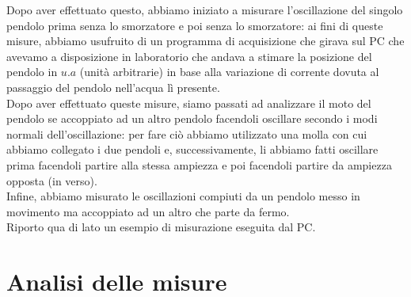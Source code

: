 \documentclass{article}
\begin{document}
\begin{minipage}{0.49\textwidth}
Dopo aver effettuato questo, abbiamo iniziato a misurare l'oscillazione del singolo pendolo prima senza lo smorzatore e poi senza lo smorzatore: ai fini di queste misure, abbiamo usufruito di un programma di acquisizione che girava sul PC che avevamo a disposizione in laboratorio che andava a stimare la posizione del pendolo in $u.a$ (unità arbitrarie) in base alla variazione di corrente dovuta al passaggio del pendolo nell'acqua lì presente. \\
Dopo aver effettuato queste misure, siamo passati ad analizzare il moto del pendolo se accoppiato ad un altro pendolo facendoli oscillare secondo i modi normali dell'oscillazione: per fare ciò abbiamo utilizzato una molla con cui abbiamo collegato i due pendoli e, successivamente, li abbiamo fatti oscillare prima facendoli partire alla stessa ampiezza e poi facendoli partire da ampiezza opposta (in verso). \\
Infine, abbiamo misurato le oscillazioni compiuti da un pendolo messo in movimento ma accoppiato ad un altro che parte da fermo. \\
Riporto qua di lato un esempio di misurazione eseguita dal PC.
\end{minipage}
\section{Analisi delle misure}
\end{document}
